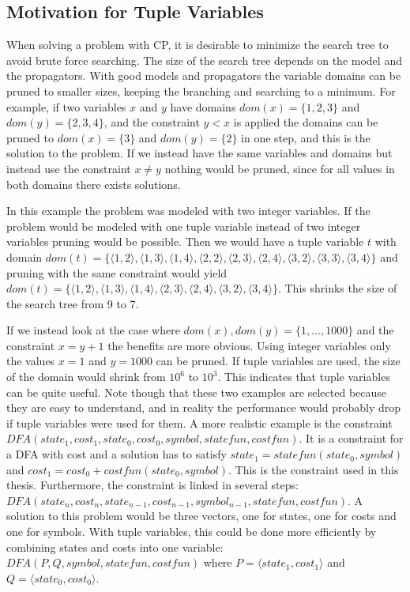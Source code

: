 \documentclass[a4paper,11pt]{article}
\begin{document}
\subsection{Motivation for Tuple Variables}
When solving a problem with CP, it is desirable to minimize the search tree to avoid brute force searching. The size of the search tree depends on the model and the propagators. With good models and propagators the variable domains can be pruned to smaller sizes, keeping the branching and searching to a minimum. For example, if two variables $x$ and $y$ have domains $dom(x)=\{1,2,3\}$ and $dom(y)=\{2,3,4\}$, and the constraint $y<x$ is applied the domains can be pruned to $dom(x)=\{3\}$ and $dom(y)=\{2\}$ in one step, and this is the solution to the problem. If we instead have the same variables and domains but instead use the constraint $x\neq y$ nothing would be pruned, since for all values in both domains there exists solutions. 

In this example the problem was modeled with two integer variables. If the problem would be modeled with one tuple variable instead of two integer variables pruning would be possible. Then we would have a tuple variable $t$ with domain $dom(t)=\{\langle1,2\rangle,\langle1,3\rangle,\langle1,4\rangle,\langle2,2\rangle,\langle2,3\rangle,\langle2,4\rangle,\langle3,2\rangle,\langle3,3\rangle,\langle3,4\rangle\}$ and pruning with the same constraint would yield $dom(t)=\{\langle1,2\rangle,\langle1,3\rangle,\langle1,4\rangle,\langle2,3\rangle,\langle2,4\rangle,\langle3,2\rangle,\langle3,4\rangle\}$. This shrinks the size of the search tree from 9 to 7. 

If we instead look at the case where $dom(x),dom(y)=\{1,\ldots,1000\}$ and the constraint $x=y+1$ the benefits are more obvious. Using integer variables only the values $x=1$ and $y=1000$ can be pruned. If tuple variables are used, the size of the domain would shrink from $10^6$ to $10^3$. This indicates that tuple variables can be quite useful. Note though that these two examples are selected because they are easy to understand, and in reality the performance would probably drop if tuple variables were used for them. A more realistic example is the constraint $DFA(state_1, cost_1, state_0, cost_0, symbol, statefun, costfun)$. It is a constraint for a DFA with cost and a solution has to satisfy $state_1= statefun(state_0, symbol)$ and $cost_1=cost_0+costfun(state_0, symbol)$. This is the constraint used in this thesis. Furthermore, the constraint is linked in several steps: $DFA(state_n, cost_n, state_{n-1}, cost_{n-1}, symbol_{n-1}, statefun, costfun)$. A solution to this problem would be three vectors, one for states, one for costs and one for symbols. With tuple variables, this could be done more efficiently by combining states and costs into one variable: $DFA(P, Q, symbol, statefun, costfun)$ where $P=\langle state_1, cost_1\rangle$ and $Q=\langle state_0, cost_0\rangle$.
\end{document}
